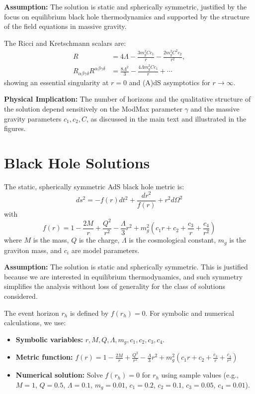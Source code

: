 \documentclass[superscriptaddress, prd, aps,amsmath,amssymb,showpacs,showkeys, onecolumn]{revtex4-2}
\begin{document}
\textbf{Assumption:} The solution is static and spherically symmetric, justified by the focus on equilibrium black hole thermodynamics and supported by the structure of the field equations in massive gravity.

The Ricci and Kretschmann scalars are:
\begin{align}
R &= 4\Lambda - \frac{3 m_g^2 C c_1}{r} - \frac{2 m_g^2 C^2 c_2}{r^2}, \\
R_{\alpha\beta\gamma\delta} R^{\alpha\beta\gamma\delta} &= \frac{8\Lambda^2}{3} - \frac{4\Lambda m_g^2 C c_1}{r} + \cdots
\end{align}
showing an essential singularity at $r=0$ and (A)dS asymptotics for $r \to \infty$.

\textbf{Physical Implication:} The number of horizons and the qualitative structure of the solution depend sensitively on the ModMax parameter $\gamma$ and the massive gravity parameters $c_1, c_2, C$, as discussed in the main text and illustrated in the figures.

\section{Black Hole Solutions}
The static, spherically symmetric AdS black hole metric is:
\begin{equation}
ds^2 = -f(r) dt^2 + \frac{dr^2}{f(r)} + r^2 d\Omega^2
\end{equation}
with
\begin{equation}
f(r) = 1 - \frac{2M}{r} + \frac{Q^2}{r^2} - \frac{\Lambda}{3} r^2 + m_g^2 (c_1 r + c_2 + \frac{c_3}{r} + \frac{c_4}{r^2})
\end{equation}
where $M$ is the mass, $Q$ is the charge, $\Lambda$ is the cosmological constant, $m_g$ is the graviton mass, and $c_i$ are model parameters.

\textbf{Assumption:} The solution is static and spherically symmetric. This is justified because we are interested in equilibrium thermodynamics, and such symmetry simplifies the analysis without loss of generality for the class of solutions considered.

The event horizon $r_h$ is defined by $f(r_h) = 0$.
For symbolic and numerical calculations, we use:
\begin{itemize}
    \item \textbf{Symbolic variables:} $r, M, Q, \Lambda, m_g, c_1, c_2, c_3, c_4$.
    \item \textbf{Metric function:} $f(r) = 1 - \frac{2M}{r} + \frac{Q^2}{r^2} - \frac{\Lambda}{3} r^2 + m_g^2 (c_1 r + c_2 + \frac{c_3}{r} + \frac{c_4}{r^2})$
    \item \textbf{Numerical solution:} Solve $f(r_h) = 0$ for $r_h$ using sample values (e.g., $M=1$, $Q=0.5$, $\Lambda=0.1$, $m_g=0.01$, $c_1=0.2$, $c_2=0.1$, $c_3=0.05$, $c_4=0.01$).
\end{itemize}
\end{document}
